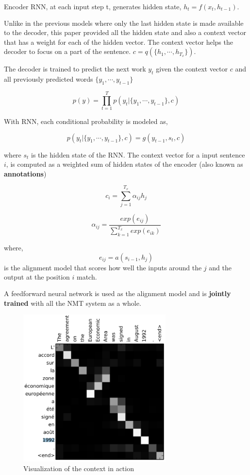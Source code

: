 \documentclass[a4paper]{article}
\begin{document}
Encoder  RNN,  at each  input step t,  generates  hidden state,  $h_t  =  f(x_t,
h_{t-1})$.

Unlike in the previous models where only the last hidden state is made available
to the decoder, this paper  provided  all  the hidden state  and also a  context
vector that has a weight for each of the hidden vector. The context vector helps
the decoder to focus on a part of the sentence. $c = q(\{h_1,\cdots,h_{T_x}\})$.


The decoder is  trained to predict the next work $y_t$ given  the context vector
$c$ and all previously predicted words $\{ y_1, \cdots, y_{t-1}\}$


\begin{equation*}
  p(y) = \prod^{T}_{t=1} p(y_t | \{ y_1, \cdots, y_{t-1}\} ,c )
\end{equation*}


With RNN, each conditional probability is modeled as,


\begin{equation*}
  p(y_t | \{ y_1, \cdots, y_{t-1}\}, c) = g(y_{t-1}, s_t, c)
\end{equation*}


where  $s_t$ is the hidden  state  of  the RNN. The context vector  for a  input
sentence $i$, is  computed  as  a weighted  sum of  hidden states of the encoder
(also known as \textbf{annotations})


\begin{equation*}
  c_i = \sum_{j=1}^{T_{x}} \alpha_{ij} h_j
\end{equation*}


\begin{equation*}
  \alpha_{ij} = \frac{ exp(e_{ij})}{ \sum_{k=1}^{T_x} exp (e_{ik})}
\end{equation*}

where, $$ e_{ij}  = a(s_{i-1},  h_j)  $$ is the alignment model that  scores how
well the inputs around the $j$ and the output at the position $i$ match.


A   feedforward  neural  network   is  used  as   the  alignment  model  and  is
\textbf{jointly trained} with all the NMT system as a whole.


\begin{figure}
  \includegraphics[height=8cm]{img/contextres.png}
  \caption{Visualization of the context in action}
  \label{fig:contextvis}
\end{figure}
\end{document}
